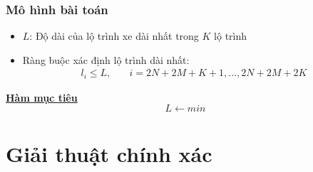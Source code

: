 \documentclass{beamer}
\begin{document}
	\begin{frame}
		\frametitle{Mô hình bài toán}
		\begin{itemize}
			\item $L$: Độ dài của lộ trình xe dài nhất trong $K$ lộ trình
			\item Ràng buộc xác định lộ trình dài nhất:
			\begin{align}
				l_i\leq L,\quad & i=2N+2M+K+1,...,2N+2M+2K
			\end{align}
		\end{itemize}
		\textbf{\underline{Hàm mục tiêu}}
		\begin{equation}
			L \leftarrow min
		\end{equation}
	\end{frame}

	
	\section{Giải thuật chính xác}
	
	
\end{document}
